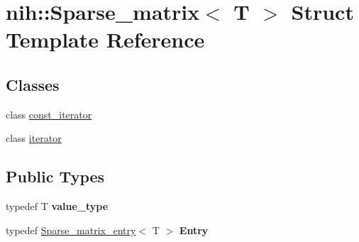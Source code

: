 \hypertarget{structnih_1_1_sparse__matrix}{
\section{nih\-:\-:\-Sparse\-\_\-matrix$<$ \-T $>$ \-Struct \-Template \-Reference}
\label{structnih_1_1_sparse__matrix}
}
\subsection*{\-Classes}
\begin{DoxyCompactItemize}
\item 
class \hyperlink{classnih_1_1_sparse__matrix_1_1const__iterator}{const\-\_\-iterator}
\item 
class \hyperlink{classnih_1_1_sparse__matrix_1_1iterator}{iterator}
\end{DoxyCompactItemize}
\subsection*{\-Public \-Types}
\begin{DoxyCompactItemize}
\item 
\hypertarget{structnih_1_1_sparse__matrix_a09ae558a5b3c2318abef3916e7f2c2fa}{
typedef \-T {\bfseries value\-\_\-type}}
\label{structnih_1_1_sparse__matrix_a09ae558a5b3c2318abef3916e7f2c2fa}

\item 
\hypertarget{structnih_1_1_sparse__matrix_ab110c65e5e6c24fb9b242a14f19c7578}{
typedef \hyperlink{structnih_1_1_sparse__matrix__entry}{\-Sparse\-\_\-matrix\-\_\-entry}$<$ \-T $>$ {\bfseries \-Entry}}
\label{structnih_1_1_sparse__matrix_ab110c65e5e6c24fb9b242a14f19c7578}

\end{DoxyCompactItemize}
